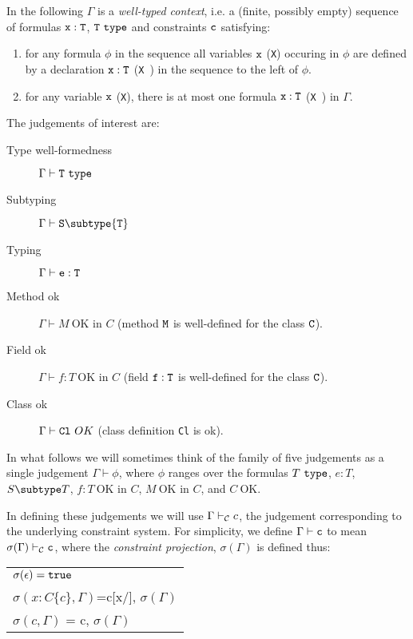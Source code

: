 In the following $\Gamma$ is a {\em well-typed context}, i.e.{} a
(finite, possibly empty) sequence of formulas $\tt x:T$, $\tt T\
\mbox{\tt type}$ and constraints $\tt c$ satisfying:
\begin{enumerate}
  \item for any formula $\phi$ in the sequence all variables $\tt x$
    ({\tt X}) occuring in $\phi$ are defined by a declaration $\tt
    x:T$ ({\tt X\ \type}) in the sequence to the left of $\phi$.

  \item for any variable $\tt x$ ({\tt X}), there is at most one
  formula $\tt x:T$ ({\tt X\ \type})  in $\Gamma$.
\end{enumerate}

The judgements of interest are:
\begin{description}
  \item[Type well-formedness]  $\Gamma \vdash {\tt T} \ {\tt type}$
  \item[Subtyping] $\Gamma \vdash {\tt S} \subtype {\tt T}$
  \item[Typing]    $\Gamma   \vdash {\tt e:T}$
  \item[Method ok] $\Gamma \vdash M\ \mbox{OK in $C$}$ (method $\tt M$ is well-defined for the class $\tt C$). 
  \item[Field ok]  $\Gamma \vdash f:T\ \mbox{OK in $C$}$ (field $\tt f:T$ is well-defined for the class $\tt C$).
  \item[Class ok] $\Gamma \vdash {\tt Cl} \ OK$ (class definition {\tt Cl} is ok). 
\end{description}


In what follows we will sometimes think of the family of five
judgements as a single judgement $\Gamma \vdash \phi$, where $\phi$
ranges over the formulas $T\ \tt type$, $e:T$, $S \subtype T$, $f:T\
\mbox{OK in $C$}$, $M\ \mbox{OK in $C$}$, and $C\ \mbox{OK}$.

In defining these judgements we will use $\Gamma \vdash_{\cal C} c$,
the judgement corresponding to the underlying constraint system. For simplicity,
we define $\Gamma \vdash {\tt c}$ to mean $\sigma(\Gamma)\vdash_{\cal C} {\tt c}$,
where the {\em constraint projection}, $\sigma(\Gamma)$ is defined thus:

\begin{tabular}{l}
$\sigma(\epsilon)={\tt true}$\\
$\sigma(x:C\{c\}, \Gamma)$=c[x/\self], $\sigma(\Gamma)$\\
$\sigma(c,\Gamma)$ = c, $\sigma(\Gamma)$
\end{tabular}

